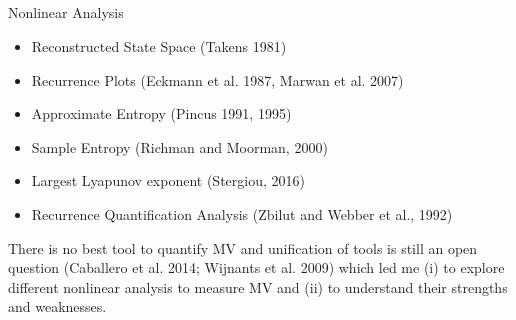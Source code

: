 \subsection{}
{


\begin{frame}{Nonlinear Analysis}


\begin{itemize}
	\item Reconstructed State Space (Takens 1981)
	\item Recurrence Plots (Eckmann et al. 1987, Marwan et al. 2007)
	\item Approximate Entropy (Pincus 1991, 1995)
	\item Sample Entropy (Richman and Moorman, 2000)
	\item Largest Lyapunov exponent (Stergiou, 2016)
	\item Recurrence Quantification Analysis (Zbilut and Webber et al., 1992)
\end{itemize}





There is no best tool to quantify MV and unification of tools is still
an open question (Caballero et al. 2014; Wijnants et al. 2009)
which led me (i) to explore different nonlinear analysis 
to measure MV and (ii) to understand their strengths and weaknesses. 

\end{frame}
}







